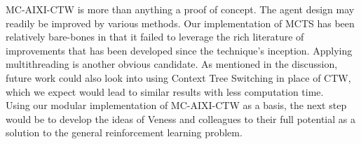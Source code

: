\documentclass{article}
\theoremstyle{definition}
\newtheorem{primary statistics}[definition]{Primary Statistics}
\newtheorem{auxiliary statistics}[definition]{Auxiliary Statistics}
\begin{document}
MC-AIXI-CTW is more than anything a proof of concept. The agent design may readily be improved by various methods. Our implementation of MCTS has been relatively bare-bones in that it failed to leverage the rich literature of improvements that has been developed since the technique's inception. Applying multithreading is another obvious candidate. As mentioned in the discussion, future work could also look into using Context Tree Switching in place of CTW, which we expect would lead to similar results with less computation time. \\

Using our modular implementation of MC-AIXI-CTW as a basis, the next step would be to develop the ideas of Veness and colleagues to their full potential as a solution to the general reinforcement learning problem.  \\

\printbibliography
\end{document}
